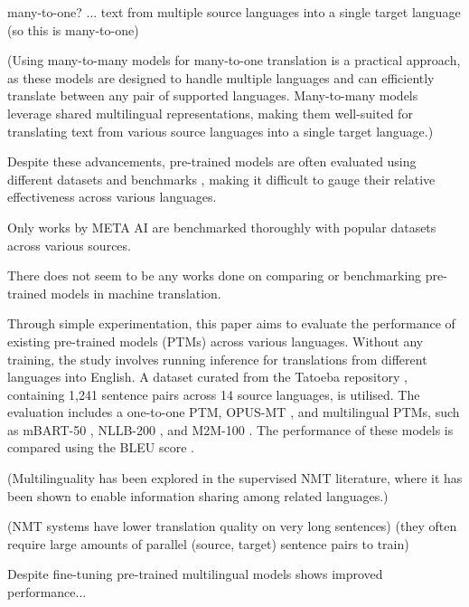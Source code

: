 \documentclass[a4paper]{article}
\begin{document}
many-to-one? ... text from multiple source languages into a single target language (so this is many-to-one)

(Using many-to-many models for many-to-one translation is a practical approach, as these models are designed to handle multiple languages and can efficiently translate between any pair of supported languages. Many-to-many models leverage shared multilingual representations, making them well-suited for translating text from various source languages into a single target language.)

Despite these advancements, pre-trained models are often evaluated using different datasets and benchmarks \cite{liu-2020-mbart,nllb200-2020,fan-2020-m2m100,wei-2023-polylm}, making it difficult to gauge their relative effectiveness across various languages.

Only works by META AI are benchmarked thoroughly with popular datasets across various sources.

There does not seem to be any works done on comparing or benchmarking pre-trained models in machine translation.

Through simple experimentation, this paper aims to evaluate the performance of existing pre-trained models (PTMs) across various languages. Without any training, the study involves running inference for translations from different languages into English. A dataset curated from the Tatoeba repository \cite{tatoeba}, containing 1,241 sentence pairs across 14 source languages, is utilised. The evaluation includes a one-to-one PTM, OPUS-MT \cite{tiedemann-2020-opus-mt}, and multilingual PTMs, such as mBART-50 \cite{liu-2020-mbart}, NLLB-200 \cite{nllb200-2020}, and M2M-100 \cite{fan-2020-m2m100}. The performance of these models is compared using the BLEU score \cite{papieni-2002-bleu}.

(Multilinguality has been explored in the supervised NMT literature, where it has been shown to enable information sharing among related languages.) \cite{garcia-2020-multilingual}

(NMT systems have lower translation quality on very long sentences) \cite{koehn-2017-challenges}
(they often require large amounts of parallel (source, target) sentence pairs to train) \cite{koehn-2017-challenges}

Despite fine-tuning pre-trained multilingual models shows improved performance... \cite{cooper-stickland-2021-recipes}

\end{document}

